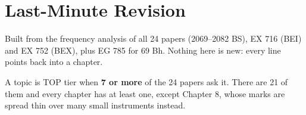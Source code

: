 \cleardoublepage
\section{Last-Minute Revision}

{\color{sub}\footnotesize Built from the frequency analysis of all 24 papers (2069--2082 BS),
EX 716 (BEI) and EX 752 (BEX), plus EG 785 for 69 Bh. Nothing here is new: every line points
back into a chapter.}

\hr


{\color{sub}\footnotesize A topic is TOP tier when \textbf{7 or more} of the 24 papers ask it.
There are 21 of them and every chapter has at least one, except Chapter 8, whose marks are
spread thin over many small instruments instead.}

